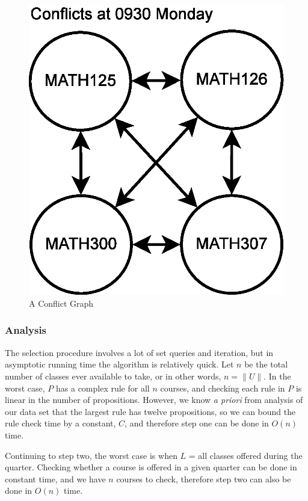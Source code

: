 \documentclass[11pt]{article} %
\begin{document}
\begin{figure} [ht] 
    \begin{center}
        \includegraphics[scale=0.35]{conflict_graph_ex} 
    \end{center} 
    \caption{A Conflict Graph} 
    \label{conflictg} 
\end{figure}

\subsubsection{Analysis} The selection procedure involves a lot of set queries
and iteration, but in asymptotic running time the algorithm is relatively quick.
Let $n$ be the total number of classes ever available to take, or in other
words, $n = \|U\|$. In the worst case, $P$ has a complex rule for all $n$
courses, and checking each rule in $P$ is linear in the number of propositions.
However, we know {\it a priori} from analysis of our data set that the largest
rule has twelve propositions, so we can bound the rule check time by a constant,
$C$, and therefore step one can be done in $O(n)$ time.

Continuing to step two, the worst case is when $L$ = {all classes offered during
the quarter}.  Checking whether a course is offered in a given quarter can be
done in constant time, and we have $n$ courses to check, therefore step two can
also be done in $O(n)$ time.
\end{document}
